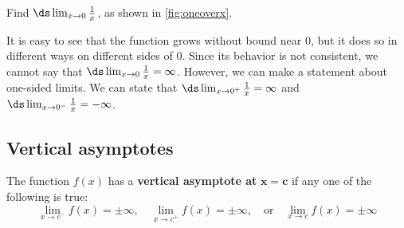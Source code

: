 \begin{example}\label{ex_inflim2}
Find $\ds\lim_{x\to0}\frac1x$, as shown in \autoref{fig:oneoverx}.

\solution
It is easy to see that the function grows without bound near 0, but it does so in different ways on different sides of 0.  Since its behavior is not consistent, we cannot say that $\ds \lim_{x\to 0}\frac{1}{x}=\infty$. However, we can make a statement about one-sided limits. We can state that $\ds \lim_{x\to0^+}\frac1x=\infty$ and $\ds \lim_{x\to0^-}\frac1x=-\infty$.
\end{example}

\subsection{Vertical asymptotes}

\begin{definition}\label{def:vert_asymp}
The function $f(x)$ has a \textbf{vertical asymptote at} $\mathbf{x=c}$ if any one of the following is true:
\[
\lim_{x\to c^-} f(x)=\pm \infty, \quad \lim_{x\to c^+} f(x)=\pm \infty, \quad \text{or} \quad \lim_{x\to c} f(x)=\pm \infty
\]
\end{definition}



